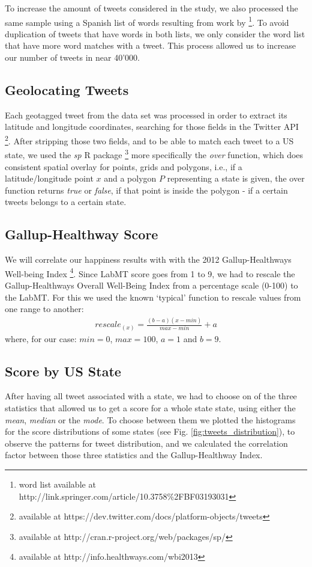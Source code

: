 \documentclass{llncs}
\begin{document}
To increase the amount of tweets considered in the study, we also processed the same sample using a Spanish list of words resulting from work by \cite{Redondo2007} \footnote{word list available at http://link.springer.com/article/10.3758\%2FBF03193031}. To avoid duplication of tweets that have words in both lists, we only consider the word list that have more word matches with a tweet. This process allowed us to increase our number of tweets in near 40'000.


\subsection{Geolocating Tweets}
Each geotagged tweet from the data set was processed in order to extract its latitude and longitude coordinates, searching for those fields in the Twitter API \footnote{available at https://dev.twitter.com/docs/platform-objects/tweets}. After stripping those two fields, and to be able to match each tweet to a US state, we used the \emph{sp} R package \footnote{available at http://cran.r-project.org/web/packages/sp/} more specifically the \emph{over} function, which does consistent spatial overlay for points, grids and polygons, i.e., if a latitude/longitude point $x$ and a polygon $P$ representing a state is given, the over function returns \emph{true} or \emph{false}, if that point is inside the polygon - if a certain tweets belongs to a certain state.


\subsection{Gallup-Healthway Score}
We will correlate our happiness results with with the 2012 Gallup-Healthways Well-being Index \cite{GallupHealthway2013} \footnote{available at http://info.healthways.com/wbi2013}. Since LabMT score goes from 1 to 9, we had to rescale the Gallup-Healthways Overall Well-Being Index from a percentage scale (0-100) to the LabMT. For this we used the known `typical' function to rescale values from one range to another:
\begin{align*}
rescale_(x) = \frac{(b-a)(x-min)}{max-min} + a \tag{2}\label{eq:2}
\end{align*}
where, for our case: $min = 0$, $max = 100$, $a = 1$ and $b = 9$.


\subsection{Score by US State}
After having all tweet associated with a state, we had to choose on of the three statistics that allowed us to get a score for a whole state state, using either the \emph{mean}, \emph{median} or the \emph{mode}. To choose between them we plotted the histograms for the score distributions of some states (see Fig. \ref{fig:tweets_distribution}), to observe the patterns for tweet distribution, and we calculated the correlation factor between those three statistics and the Gallup-Healthway Index.
\end{document}
